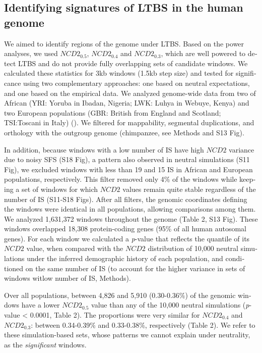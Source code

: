 \begin{refsection}
\begin{otherlanguage}{english}

\subsection{Identifying signatures of LTBS in the human genome}

We aimed to identify regions of the genome under LTBS. Based on the power analyses, we used $NCD2_{0.5}$, $NCD2_{0.4}$ and $NCD2_{0.3}$, which are well powered to detect LTBS and do not provide fully overlapping sets of candidate windows. We calculated these statistics for 3kb windows (1.5kb step size) and tested for significance using two complementary approaches: one based on neutral expectations, and one based on the empirical data. We analyzed genome-wide data from two of African (YRI: Yoruba in Ibadan, Nigeria; LWK: Luhya in Webuye, Kenya) and two European populations (GBR: British from England and Scotland; TSI:Toscani in Italy) (\cite{Abecasis2012}). We filtered for mappability, segmental duplications, and orthology with the outgroup genome (chimpanzee, see Methods and S13 Fig).

In addition, because windows with a low number of IS have high $NCD2$ variance due to noisy SFS (S18 Fig), a pattern also observed in neutral simulations (S11 Fig), we excluded windows with less than 19 and 15 IS in African and European populations, respectively. This filter removed only 4\% of the windows while keeping a set of windows for which $NCD2$ values remain quite stable regardless of the number of IS (S11-S18 Figs). After all filters, the genomic coordinates defining the windows were identical in all populations, allowing comparisons among them. We analyzed 1,631,372 windows throughout the genome (Table 2, S13 Fig). These windows overlapped 18,308 protein-coding genes (95\% of all human autosomal genes). For each window we calculated a \emph{p}-value that reflects the quantile of its $NCD2$ value, when compared with the $NCD2$ distribution of 10,000 neutral simulations under the inferred demographic history of each population, and conditioned on the same number of IS (to account for the higher variance in sets of windows witlow number of IS, Methods).

Over all populations, between 4,826 and 5,910 (0.30-0.36\%) of the genomic windows have a lower $NCD2_{0.5}$ value than any of the 10,000 neutral simulations (\emph{p}-value < 0.0001, Table 2). The
proportions were very similar for $NCD2_{0.4}$ and $NCD2_{0.3}$: between 0.34-0.39\% and 0.33-0.38\%,
respectively (Table 2). We refer to these simulation-based sets, whose patterns we cannot explain under neutrality, as the \emph{significant} windows.


\end{otherlanguage}
\end{refsection}
